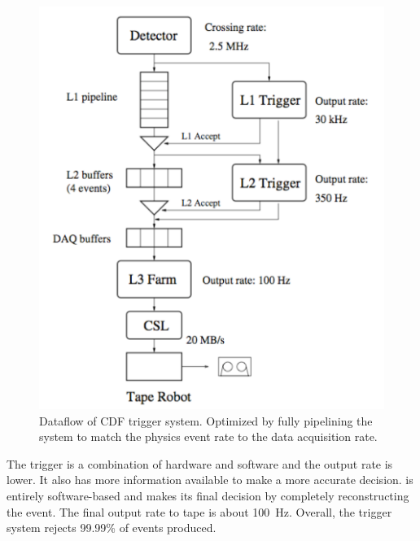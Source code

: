 \begin{figure}[p]
\begin{centering}
\includegraphics[scale=0.8]{CDFTriggerSystem_Scehmatic.pdf}
\caption{Dataflow of CDF  trigger system. Optimized by fully pipelining the system to match the physics event rate to the data acquisition rate.}
\label{fig:TriggerSystemSchematic}
\end{centering}
\end{figure}


The  trigger is a combination of hardware and software and the output rate is lower. It also has more information available to make a more accurate decision.  is entirely software-based and makes its final decision by completely reconstructing the event. The final output rate to tape is about 100~Hz. Overall, the trigger system rejects 99.99\% of events produced.




